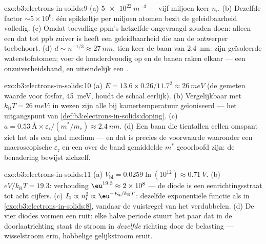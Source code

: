 \begin{solution}{exo:b3:electrons-in-solids:9}
(a) $\qty{5e22}{m^{-3}}$ --- vijf miljoen keer $n_{\text{i}}$.
(b) Dezelfde factor $\sim5\times10^6$: één spikkeltje per miljoen
atomen bezit de geleidbaarheid volledig. (c) Omdat toevallige ppm's
hetzelfde ongevraagd zouden doen: alleen een  dat tot ppb zuiver is heeft een
geleidbaarheid die aan de ontwerper toebehoort. (d) $d \sim n^{-1/3}
\approx \qty{27}{nm}$, tien keer de baan van \qty{2.4}{nm}: 
zijn geïsoleerde waterstofatomen; voer de  honderdvoudig op en de
banen raken elkaar --- een onzuiverheidsband, en uiteindelijk een .
\end{solution}

\begin{solution}{exo:b3:electrons-in-solids:10}
(a) $E = 13.6\times0.26/11.7^2 \approx \qty{26}{meV}$ (de
gemeten waarde voor fosfor, \qty{45}{meV}, houdt de schaal
eerlijk). (b) Vergelijkbaar met $k_{\text{B}}T = \qty{26}{meV}$:
in wezen zijn alle  bij kamertemperatuur geïoniseerd --- het
uitgangspunt van \cref{def:b3:electrons-in-solids:doping}. (c) $a =
\qty{0.53}{\angstrom}\times\varepsilon_{\text{r}}/(m^*/
m_{\text{e}}) \approx \qty{2.4}{nm}$. (d) Een baan die tientallen
cellen omspant ziet het  als een glad medium --- en dat is
precies de voorwaarde waaronder een macroscopische
$\varepsilon_{\text{r}}$ en een over de band gemiddelde $m^*$ geoorloofd zijn:
de benadering bewijst zichzelf.
\end{solution}

\begin{solution}{exo:b3:electrons-in-solids:11}
(a) $V_{\text{bi}} = 0.0259\ln(10^{12}) \approx \qty{0.71}{V}$.
(b) $eV/k_{\text{B}}T = 19.3$: verhouding $\eu^{19.3} \approx
2\times10^{8}$ --- de diode is een eenrichtingsstraat tot acht
cijfers. (c) $I_0 \propto n_{\text{i}}^2 \propto
\eu^{-E_{\text{g}}/k_{\text{B}}T}$: dezelfde exponentiële functie als in
\cref{exo:b3:electrons-in-solids:8}, vandaar de
vuistregel van het verdubbelen. (d) De vier diodes vormen een ruit: elke
halve periode stuurt het paar dat in de doorlaatrichting staat de stroom
in \emph{dezelfde} richting door de belasting --- wisselstroom erin, hobbelige
gelijkstroom eruit.
\end{solution}

